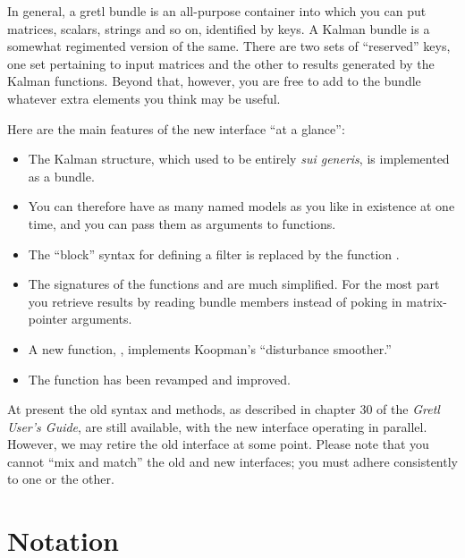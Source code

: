\documentclass[a4paper]{article}
\begin{document}
In general, a gretl bundle is an all-purpose container into which you
can put matrices, scalars, strings and so on, identified by keys. A
Kalman bundle is a somewhat regimented version of the same. There are
two sets of ``reserved'' keys, one set pertaining to input matrices
and the other to results generated by the Kalman functions.  Beyond
that, however, you are free to add to the bundle whatever extra
elements you think may be useful.

Here are the main features of the new interface ``at a glance'':
%
\begin{itemize}
\item The Kalman structure, which used to be entirely \textit{sui
    generis}, is implemented as a bundle.
\item You can therefore have as many named models as you like in
  existence at one time, and you can pass them as arguments to
  functions.
\item The ``block'' syntax for defining a filter is replaced by the
  function .
\item The signatures of the functions  and 
  are much simplified. For the most part you retrieve results by
  reading bundle members instead of poking in matrix-pointer
  arguments.
\item A new function, , implements Koopman's
  ``disturbance smoother.''
\item The  function has been revamped and improved.
\end{itemize}

At present the old syntax and methods, as described in chapter 30 of
the \textit{Gretl User's Guide}, are still available, with the new
interface operating in parallel. However, we may retire the old
interface at some point. Please note that you cannot ``mix and match''
the old and new interfaces; you must adhere consistently to one or the
other.

\section{Notation}
\end{document}
